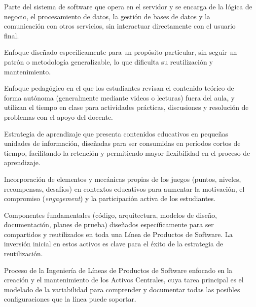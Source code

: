 \begin{description}[style=nextline,leftmargin=0pt]
    \item[Servidor de Aplicaciones (\textit{backend})]
    Parte del sistema de software que opera en el servidor y se encarga de la lógica de negocio, el procesamiento de datos, la gestión de bases de datos y la comunicación con otros servicios, sin interactuar directamente con el usuario final.
    
    \item[Solución ad hoc (\textit{ad hoc})]
    Enfoque diseñado específicamente para un propósito particular, sin seguir un patrón o metodología generalizable, lo que dificulta su reutilización y mantenimiento.
    
    \item[Aula Invertida (\textit{Flipped Classroom})]
    Enfoque pedagógico en el que los estudiantes revisan el contenido teórico de forma autónoma (generalmente mediante videos o lecturas) fuera del aula, y utilizan el tiempo en clase para actividades prácticas, discusiones y resolución de problemas con el apoyo del docente.
    
    \item[Microaprendizaje (\textit{Micro-learning})]
    Estrategia de aprendizaje que presenta contenidos educativos en pequeñas unidades de información, diseñadas para ser consumidas en períodos cortos de tiempo, facilitando la retención y permitiendo mayor flexibilidad en el proceso de aprendizaje.
    
    \item[Gamificación]
    Incorporación de elementos y mecánicas propias de los juegos (puntos, niveles, recompensas, desafíos) en contextos educativos para aumentar la motivación, el compromiso (\textit{engagement}) y la participación activa de los estudiantes.
    
    \item[Activos Centrales (\textit{Core Assets})]
    Componentes fundamentales (código, arquitectura, modelos de diseño, documentación, planes de prueba) diseñados específicamente para ser compartidos y reutilizados en toda una Línea de Productos de Software. La inversión inicial en estos activos es clave para el éxito de la estrategia de reutilización.
    
    \item[Ingeniería del Dominio (\textit{Domain Engineering})]
    Proceso de la Ingeniería de Líneas de Productos de Software enfocado en la creación y el mantenimiento de los Activos Centrales, cuya tarea principal es el modelado de la variabilidad para comprender y documentar todas las posibles configuraciones que la línea puede soportar.
    

\end{description}

